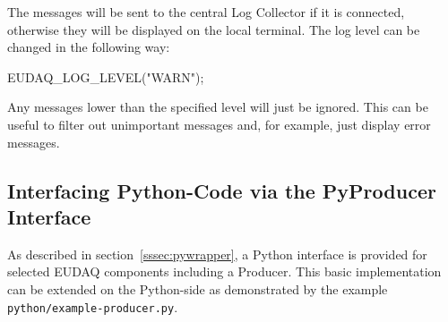The messages will be sent to the central Log Collector if it is connected,
otherwise they will be displayed on the local terminal.
The log level can be changed in the following way:
\begin{listing}
EUDAQ_LOG_LEVEL("WARN");
\end{listing}

Any messages lower than the specified level will just be ignored.
This can be useful to filter out unimportant messages and, for example, just display error messages.


\subsection{Interfacing Python-Code via the PyProducer Interface}
As described in section~\ref{sssec:pywrapper}, a Python interface is
provided for selected EUDAQ components including a Producer. This
basic implementation can be extended on the Python-side as
demonstrated by the example \texttt{python/example-producer.py}.
